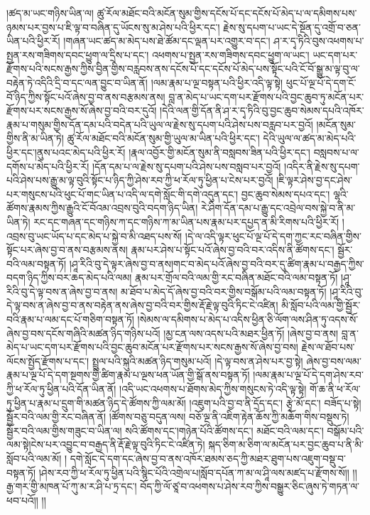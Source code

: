 །ཚད་མ་ཡང་གཉིས་ཡིན་ལ། ཚུ་རོལ་མཐོང་བའི་མངོན་སུམ་གྱིས་དངོས་པོ་དང་དངོས་པོ་མེད་པ་ལ་དམིགས་པས་ཉམས་པར་བྱས་པ་ཇི་ལྟ་བ་བཞིན་དུ་ཡོངས་སུ་མ་ཤེས་པའི་ཕྱིར་དང་། རྗེས་སུ་དཔག་པ་ཡང་དེ་སྔོན་དུ་འགྲོ་བ་ཅན་ཡིན་པའི་ཕྱིར་རོ། །གཞན་ཡང་ཚད་མ་མེད་པས་ཐེ་ཚོམ་དང་ལྡན་པར་འགྱུར་བ་དང་། ཤ་ར་དྭ་ཏིའི་བུས་འཕགས་པ་སྤྱན་རས་གཟིགས་དབང་ཕྱུག་ལ་དྲིས་པ་དང་། འཕགས་པ་སྤྱན་རས་གཟིགས་དབང་ཕྱུག་ལ་ཡང་། ཡང་དག་པར་རྫོགས་པའི་སངས་རྒྱས་ཀྱིས་བྱིན་གྱིས་བརླབས་ནས་དངོས་པོ་དང་དངོས་པོ་མེད་པས་སྟོང་པའི་ངོ་བོ་སྒྱུ་མ་ལྟ་བུ་ལ་བརྟེན་ཏེ་འདིའི་དྲི་བ་དང་ལན་བྱུང་བ་ཡིན་ནོ། །ལམ་རྣམ་པ་ལྔ་བསྟན་པའི་ཕྱིར་འདི་ལྟ་སྟེ། ཕུང་པོ་ལྔ་པོ་དེ་དག་ངོ་བོ་ཉིད་ཀྱིས་སྟོང་པའོ་ཞེས་བྱ་བ་ནས་བརྩམས་ནས། བླ་ན་མེད་པ་ཡང་དག་པར་རྫོགས་པའི་བྱང་ཆུབ་ཏུ་མངོན་པར་རྫོགས་པར་སངས་རྒྱས་སོ་ཞེས་བྱ་བའི་བར་དུའོ། །དེའི་ལན་གྱི་དོན་ནི་ཤ་ར་དྭ་ཏིའི་བུ་བྱང་ཆུབ་སེམས་དཔའི་འཁོར་རྣམ་པ་གསུམ་གྱིས་དོན་དམ་པའི་བདེན་པའི་ཡུལ་ལ་རྗེས་སུ་དཔག་པའི་ཤེས་པས་བརླབ་པར་བྱའོ། །མངོན་སུམ་གྱིས་ནི་མ་ཡིན་ཏེ། ཚུ་རོལ་མཐོང་བའི་མངོན་སུམ་གྱི་ཡུལ་མ་ཡིན་པའི་ཕྱིར་དང་། དེའི་ཡུལ་ལ་ཚད་མ་མེད་པའི་ཕྱིར་དང་།ནུས་པའང་མེད་པའི་ཕྱིར་རོ། །རྣལ་འབྱོར་གྱི་མངོན་སུམ་ནི་བསླབས་ཟིན་པའི་ཕྱིར་དང་། བསླབས་པ་ལ་དགོས་པ་མེད་པའི་ཕྱིར་རོ། །དོན་དམ་པ་ལ་རྗེས་སུ་དཔག་པའི་ཤེས་པས་བསླབ་པར་བྱའོ། །འདིར་ནི་རྗེས་སུ་དཔག་པའི་ཤེས་པས་རྒྱུ་མ་ལྟ་བུའི་སྟོང་པ་ཉིད་ཀྱི་ཤེས་རབ་ཀྱི་ཕ་རོལ་ཏུ་ཕྱིན་པ་ངེས་པར་བྱའོ། །ཇི་ལྟར་ཤེས་བྱ་དང་ཤེས་པར་གསུངས་པའི་ཕུང་པོ་གང་ཡིན་པ་འདི་ལ་དགེ་སློང་གི་དགེ་འདུན་དང་། བྱང་ཆུབ་སེམས་དཔའ་དང་། ལྷའི་ཚོགས་རྣམས་ཀྱིས་རྒྱུའི་ངོ་བོའམ་འབྲས་བུའི་བདག་ཉིད་ཡིན། རེ་ཤིག་དོན་དམ་པ་རྒྱུ་དང་འབྲེལ་བས་སྐྱེ་བ་ནི་མ་ཡིན་ཏེ། རང་དང་གཞན་དང་གཉིས་ཀ་དང་གཉིས་ཀ་མ་ཡིན་པས་རྣམ་པར་དཔྱད་ན་མི་རིགས་པའི་ཕྱིར་རོ། །འབྲས་བུ་ཡང་ཡོད་པ་དང་མེད་པ་སྐྱེ་བ་མི་འཐད་པས་སོ། །དེ་ལ་འདི་ལྟར་ཕུང་པོ་ལྔ་པོ་དེ་དག་ཀྱང་རང་བཞིན་གྱིས་སྟོང་པར་ཞེས་བྱ་བ་ནས་བརྩམས་ནས། རྣམ་པར་ཤེས་པ་སྟོང་པའོ་ཞེས་བྱ་བའི་བར་འདིས་ནི་ཚོགས་དང་། སྦྱོར་བའི་ལམ་བསྟན་ཏོ། །ཤཱ་རིའི་བུ་དེ་ལྟར་ཞེས་བྱ་བ་ནས།གང་བ་མེད་པའོ་ཞེས་བྱ་བའི་བར་དུ་ཚིག་རྣམ་པ་བརྒྱད་ཀྱིས་བདག་ཉིད་ཀྱིས་བར་ཆད་མེད་པའི་ལམ། རྣམ་པར་གྲོལ་བའི་ལམ་གྱི་རང་བཞིན་མཐོང་བའི་ལམ་བསྟན་ཏོ། །ཤཱ་རིའི་བུ་དེ་ལྟ་བས་ན་ཞེས་བྱ་བ་ནས། མ་ཐོབ་པ་མེད་དོ་ཞེས་བྱ་བའི་བར་གྱིས་བསྒོམ་པའི་ལམ་བསྟན་ཏོ། །ཤཱ་རིའི་བུ་དེ་ལྟ་བས་ན་ཞེས་བྱ་བ་ནས་བརྟེན་ནས་ཞེས་བྱ་བའི་བར་གྱིས་རྡོ་རྗེ་ལྟ་བུའི་ཏིང་ངེ་འཛིན། མི་སློབ་པའི་ལམ་གྱི་སྦྱོར་བའི་རྣམ་པ་ལམ་དང་པོ་གཅིག་བསྟན་ཏོ། །སེམས་ལ་དམིགས་པ་མེད་པ་འདིས་ཕྱིན་ཅི་ལོག་ལས་ཤིན་ཏུ་འདས་སོ་ཞེས་བྱ་བས་དངོས་གཞིའི་མཚན་ཉིད་གཉིས་པའོ། །མྱ་ངན་ལས་འདས་པའི་མཐར་ཕྱིན་ཏོ། །ཞེས་བྱ་བ་ནས། བླ་ན་མེད་པ་ཡང་དག་པར་རྫོགས་པའི་བྱང་ཆུབ་མངོན་པར་རྫོགས་པར་སངས་རྒྱས་སོ་ཞེས་བྱ་བས། རྗེས་ལ་ཐོབ་པས་ལོངས་སྤྱོད་རྫོགས་པ་དང་། སྤྲུལ་པའི་སྐུའི་མཚན་ཉིད་གསུམ་པའོ། །དེ་ལྟ་བས་ན་ཤེས་པར་བྱ་སྟེ། ཞེས་བྱ་བས་ལམ་རྣམ་པ་ལྔ་པོ་དེ་དག་སྔགས་གྱི་ཚིག་རྣམ་པ་ལྔས་ཕན་ཡོན་གྱི་སྒོ་ནས་བསྟན་ཏོ། །ལམ་རྣམ་པ་ལྔ་པོ་དེ་དག་ཤེས་རབ་ཀྱི་ཕ་རོལ་ཏུ་ཕྱིན་པའི་དོན་ཡིན་ནོ། །འདི་ཡང་འཕགས་པ་ཐོགས་མེད་ཀྱིས་གསུངས་ཏེ་འདི་ལྟ་སྟེ། གོ་ཆ་ནི་ཕ་རོལ་ཏུ་ཕྱིན་པ་རྣམ་པ་དྲུག་གི་མཚན་ཉིད་དེ་ཚོགས་ཀྱི་ལམ་མོ། །འཇུག་པའི་བྱ་བ་ནི་དྲོད་དང་། རྩྭེ་མོ་དང་། བཟོད་པ་སྟེ། སྦྱོར་བའི་ལམ་གྱི་རང་བཞིན་ནོ། །ཚོགས་བཅུ་བདུན་ལས། བཅོ་ལྔ་ནི་འཇིག་རྟེན་ཆོས་ཀྱི་མཆོག་གིས་བསྡུས་ཏེ། སྦྱོར་བའི་ལམ་གྱིས་གཟུང་བ་ཡིན་ལ། སའི་ཚོགས་དང་།གཉེན་པོའི་ཚོགས་དང་། མཐོང་བའི་ལམ་དང་། བསྒོམ་པའི་ལམ་སྟེ།ངེས་པར་འབྱུང་བ་བརྒྱད་ནི་རྡོ་རྗེ་ལྟ་བུའི་ཏིང་ངེ་འཛིན་ཏེ། སྐད་ཅིག་མ་ཅིག་ལ་མངོན་པར་བྱང་ཆུབ་པ་ནི་མི་སློབ་པའི་ལམ་མོ། །
དགེ་སློང་དེ་དག་དང་ཞེས་བྱ་བ་ནས་འཁོར་ཐམས་ཅད་ཀྱི་མཐར་ཐུག་པས་འཇུག་བསྡུ་བ་བསྟན་ཏོ། །ཤེས་རབ་ཀྱི་ཕ་རོལ་ཏུ་ཕྱིན་པའི་སྙིང་པོའི་འགྲེལ་པ།སློབ་དཔོན་ཀ་མ་ལ་ཤཱི་ལས་མཛད་པ་རྫོགས་སོ།། །།རྒྱ་གར་གྱི་མཁན་པོ་ཀུ་མ་ར་ཤི་པ་ཏྲ་དང་། བོད་ཀྱི་ལོ་ཙཱ་བ་འཕགས་པ་ཤེས་རབ་ཀྱིས་བསྒྱུར་ཅིང་ཞུས་ཏེ་གཏན་ལ་ཕབ་པའོ།། །།
